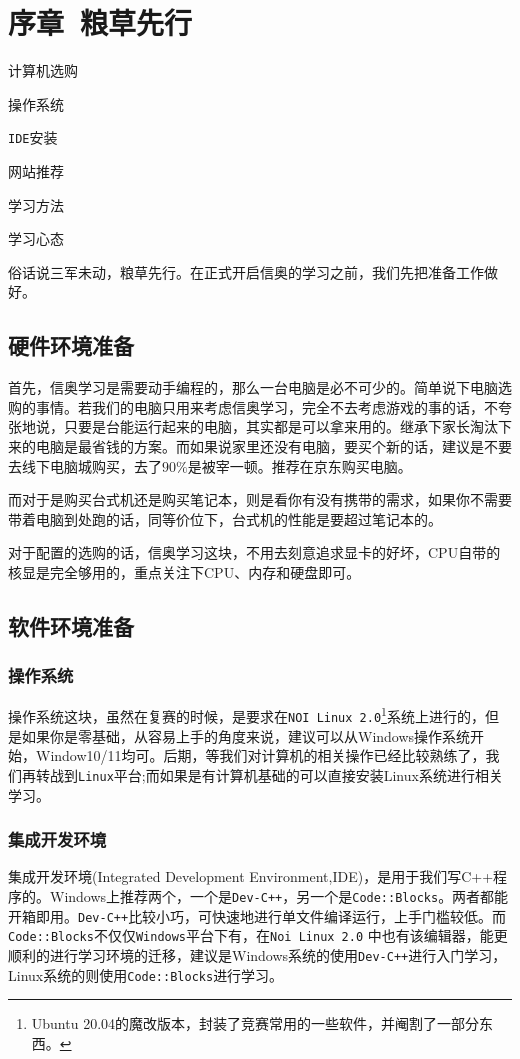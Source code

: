 \chapter*{序章\ 粮草先行}
\begin{introduction}
	\item 计算机选购
	\item 操作系统
	\item \texttt{IDE}安装
	\item 网站推荐
	\item 学习方法
	\item 学习心态
\end{introduction}

俗话说三军未动，粮草先行。在正式开启信奥的学习之前，我们先把准备工作做好。
\section{硬件环境准备}
首先，信奥学习是需要动手编程的，那么一台电脑是必不可少的。简单说下电脑选购的事情。若我们的电脑只用来考虑信奥学习，完全不去考虑游戏的事的话，不夸张地说，只要是台能运行起来的电脑，其实都是可以拿来用的。继承下家长淘汰下来的电脑是最省钱的方案。而如果说家里还没有电脑，要买个新的话，建议是不要去线下电脑城购买，去了$ 90\% $是被宰一顿。推荐在京东购买电脑。

而对于是购买台式机还是购买笔记本，则是看你有没有携带的需求，如果你不需要带着电脑到处跑的话，同等价位下，台式机的性能是要超过笔记本的。

对于配置的选购的话，信奥学习这块，不用去刻意追求显卡的好坏，CPU自带的核显是完全够用的，重点关注下CPU、内存和硬盘即可。
\section{软件环境准备}
\subsection{操作系统}
操作系统这块，虽然在复赛的时候，是要求在\texttt{NOI Linux 2.0}\footnote{Ubuntu 20.04的魔改版本，封装了竞赛常用的一些软件，并阉割了一部分东西。}系统上进行的，但是如果你是零基础，从容易上手的角度来说，建议可以从Windows操作系统开始，Window10/11均可。后期，等我们对计算机的相关操作已经比较熟练了，我们再转战到\texttt{Linux}平台;而如果是有计算机基础的可以直接安装Linux系统进行相关学习。
\subsection{集成开发环境}
集成开发环境(Integrated Development Environment,IDE)，是用于我们写C++程序的。Windows上推荐两个，一个是\texttt{Dev-C++}，另一个是\texttt{Code::Blocks}。两者都能开箱即用。\texttt{Dev-C++}比较小巧，可快速地进行单文件编译运行，上手门槛较低。而\texttt{Code::Blocks}不仅仅\texttt{Windows}平台下有，在\texttt{Noi Linux 2.0} 中也有该编辑器，能更顺利的进行学习环境的迁移，建议是Windows系统的使用\texttt{Dev-C++}进行入门学习，Linux系统的则使用\texttt{Code::Blocks}进行学习。

